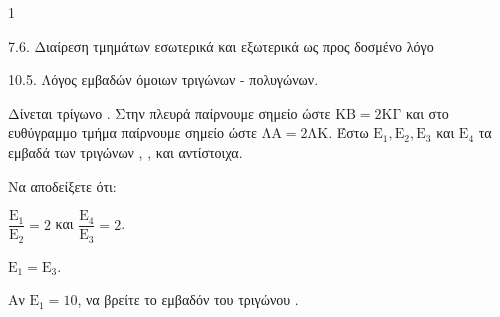 \begin{ylh}{1}
    \item 7.6. Διαίρεση τμημάτων εσωτερικά και εξωτερικά ως προς δοσμένο λόγο
    \item 10.5. Λόγος εμβαδών όμοιων τριγώνων - πολυγώνων.
\end{ylh}
\begin{figure}
    \centering
\end{figure}
Δίνεται τρίγωνο . Στην πλευρά  παίρνουμε σημείο  ώστε $\text{KB} = 2\text{ΚΓ}$ και στο ευθύγραμμο τμήμα  παίρνουμε σημείο  ώστε $\text{ΛΑ} = 2\text{ΛΚ}$. Έστω $\text{E}_1 , \text{E}_2 , \text{E}_3$ και $\text{E}_4$ τα εμβαδά των τριγώνων  ,  ,  και  αντίστοιχα.
\begin{alist}
    \item[α)] Να αποδείξετε ότι:
    \begin{rlist}
        \item $\dfrac{\text{E}_1}{\text{E}_2} = 2$ και $\dfrac{\text{E}_4}{\text{E}_3} = 2$. 
        \item $\text{E}_1 = \text{E}_3$. 
    \end{rlist}
    \item[β)] Αν $\text{E}_1 = 10$, να βρείτε το εμβαδόν του τριγώνου . 
\end{alist}